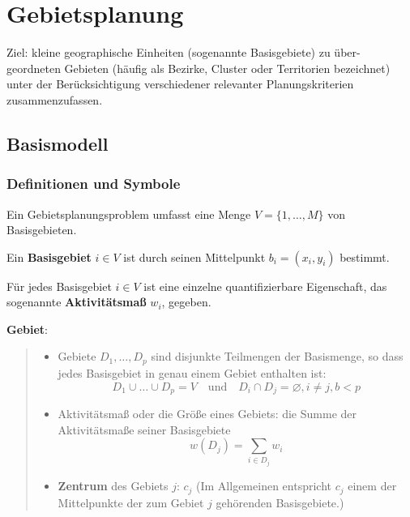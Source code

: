 


 \section{Gebietsplanung} %
    \label{sec:gebietsplanung}

      \par Ziel: kleine geographische Einheiten (sogenannte Basisgebiete) zu über- geordneten Gebieten (häufig als Bezirke, Cluster oder Territorien bezeichnet) unter der Berücksichtigung verschiedener relevanter Planungskriterien zusammenzufassen.

      \subsection{Basismodell} %
      \label{sub:basismodell}

        \subsubsection{Definitionen und Symbole} %
        \label{ssub:definitionen_und_symbole}

          \par Ein Gebietsplanungsproblem umfasst eine Menge $V = \{1, \dots, M\}$ von Basisgebieten.

        \par Ein \textbf{Basisgebiet} $i \in V$ ist durch seinen Mittelpunkt $b_i = (x_i, y_i)$ bestimmt.

        \par Für jedes Basisgebiet $i \in V$ ist eine einzelne quantifizierbare Eigenschaft, das sogenannte \textbf{Aktivitätsmaß} $w_i$, gegeben. \\

        \par \textbf{Gebiet}:

        \begin{quote}
           \begin{itemize}
              \item Gebiete $D_1, \dots, D_p$ sind disjunkte Teilmengen der Basismenge, so dass jedes Basisgebiet in genau einem Gebiet enthalten ist:
                \begin{equation*}
                  D_1 \cup \dots \cup D_p = V \quad \text{und} \quad D_i \cap D_j = \varnothing, i \neq j, b < p
                \end{equation*}
              
              \item Aktivitätsmaß oder die Größe eines Gebiets: die Summe der Aktivitätsmaße seiner Basisgebiete
                \begin{equation*}
                  w(D_j) = \sum_{i \in D_j}w_i
                \end{equation*}

              \item \textbf{Zentrum} des Gebiets $j$: $c_j$ (Im Allgemeinen entspricht $c_j$ einem der Mittelpunkte der zum Gebiet $j$ gehörenden Basisgebiete.)
            \end{itemize}
        \end{quote}
         

